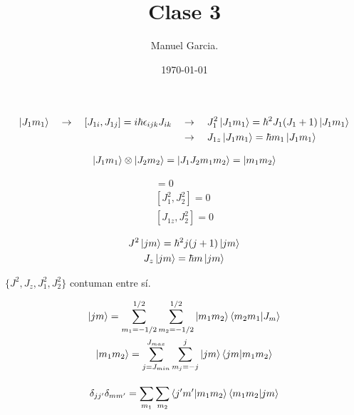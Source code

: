 \documentclass{article}
\title{Clase 3 }
\author{Manuel Garcia.}
\date{\today}
\begin{document}
\maketitle

\section{}
\begin{align*}
  \ket{J_1 m_1 } \quad \rightarrow \quad [J _{1i } , J _{1j } ] = i \hbar \epsilon _{ijk } J _{ik } \quad &\rightarrow \quad J_1^2 \ket{J_1 m_1 } = \hbar ^2 J_1 (J_1+1 ) \ket{J_1 m_1 }    \\
  &\rightarrow \quad J _{1z } \ket{J_1 m_1 }= \hbar m_1 \ket{J_1 m_1 }
\end{align*}

\hfill 

\hfill 

\begin{gather*}
  \ket{J_1 m_1 } \otimes \ket{J_2 m_2 } = \ket{J_1 J_2 m_1 m_2 } = \ket{m_1 m_2 } 
\end{gather*}

\hfill 

\hfill 

\begin{gather*}
  [\vec J_1, \vec J_2 ] = 0 \\
  [J_1^2 , J_2^2 ] = 0 \\
  [J _{1z } , J _{2 } ^2 ] = 0 
\end{gather*}

\hfill 

\hfill 

\begin{gather*}
  J^2 \ket{jm } = \hbar ^2 j(j+1) \ket{jm }\\
  J_z \ket{jm } = \hbar m \ket{jm }
\end{gather*}

\hfill 

\hfill 

$ \{J^2, J_z, J_1^2, J_2^2 \} $ contuman entre sí.

\hfill 

\hfill 

\begin{gather*}
  \ket{jm } = \displaystyle\sum_{m_1 = -1/2 }^{1/2 } \displaystyle\sum_{m_2 = -1/2 }^{1/2 }  \ket{m_1m_2 } \bra{m_2 m_1 }\ket{J_m }\\
  \ket{m_1m_2 } = \displaystyle\sum_{j = J _{min } }^{J _{max } } \displaystyle\sum_{m_j = -j }^{j } \ket{jm }\bra{jm }\ket{m_1m_2 } 
\end{gather*}

\hfill 

\hfill 

\begin{gather*}
  \delta _{jj' } \delta _{m m' } = \displaystyle\sum_{m_1 }^{}\displaystyle\sum_{m_2 }^{} \bra{j' m' }\ket{m_1m_2 } \bra{m_1m_2 }\ket{jm }   
\end{gather*}
\end{document}
